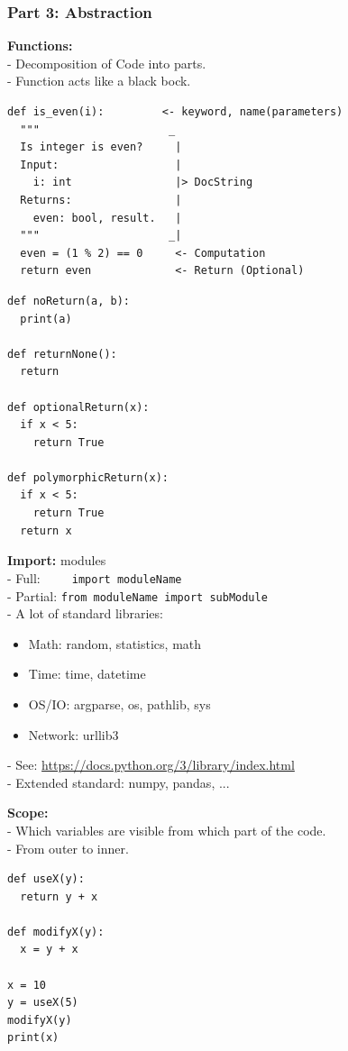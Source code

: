 \documentclass{beamer}
\begin{document}
\begin{frame}[fragile]
	\frametitle{\textbf{Part 3:} Abstraction}	
	\textbf{Functions:}\\
	- Decomposition of Code into parts.\\
	- Function acts like a black bock.
	\begin{verbatim}
def is_even(i):         <- keyword, name(parameters)
  """                    _
  Is integer is even?     |
  Input:                  |
    i: int                |> DocString
  Returns:                |
    even: bool, result.   |
  """                    _|
  even = (1 % 2) == 0     <- Computation
  return even             <- Return (Optional)
	\end{verbatim}
\end{frame}


\begin{frame}[fragile]
	\begin{example}
\begin{verbatim}
def noReturn(a, b):
  print(a)

def returnNone():
  return

def optionalReturn(x):
  if x < 5:
    return True
 
def polymorphicReturn(x):
  if x < 5:
    return True
  return x
\end{verbatim}
	\end{example}
\end{frame}


\begin{frame}[fragile]
	\textbf{Import:} modules\\
	- Full:~~~~~\texttt{import moduleName}\\
	- Partial: \texttt{from moduleName import subModule} \\
	- A lot of standard libraries:
	\begin{itemize}
		\item Math: random, statistics, math
		\item Time: time, datetime 
		\item OS/IO: argparse, os, pathlib, sys
		\item Network: urllib3
	\end{itemize}
	- See: \url{https://docs.python.org/3/library/index.html}\\
	- Extended standard: numpy, pandas, ...
	
	
\end{frame}

\begin{frame}[fragile]
	\textbf{Scope:}\\
	- Which variables are visible from which part of the code.\\
	- From outer to inner.\\
	\begin{example}
		\begin{verbatim}
def useX(y):
  return y + x

def modifyX(y):  
  x = y + x

x = 10
y = useX(5)
modifyX(y)
print(x)
		\end{verbatim}
	\end{example}
\end{frame}
\end{document}
